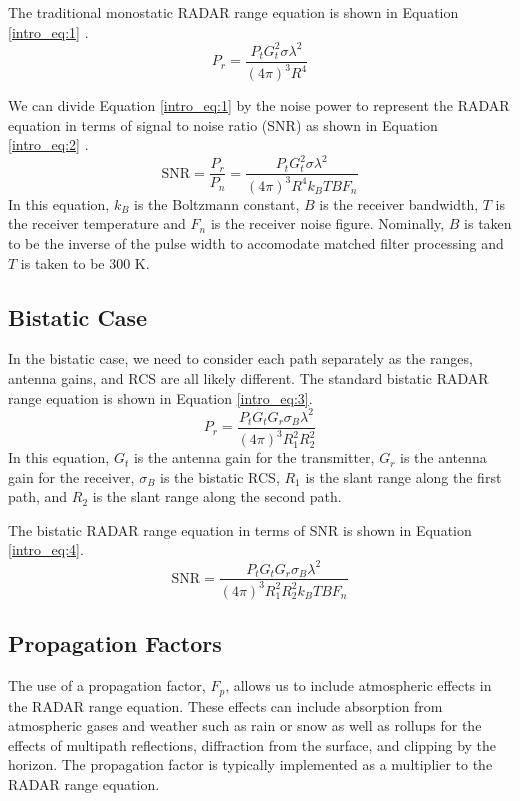 The traditional monostatic RADAR range equation is shown in Equation \ref{intro_eq:1} \cite{skolnik_handbook}.
  \begin{equation}
  \label{intro_eq:1}
 P_r = \frac{P_tG_t^2\sigma\lambda^2}{\left(4\pi\right)^3R^4}
  \end{equation}

We can divide Equation \ref{intro_eq:1} by the noise power to represent the RADAR equation in terms of signal to noise ratio (SNR) as shown in Equation \ref{intro_eq:2} \cite{skolnik_handbook}.
\begin{equation}
    \label{intro_eq:2}
\text{SNR} = \frac{P_r}{P_n} = \frac{P_tG_t^2\sigma\lambda^2}{\left(4\pi\right)^3 R^4k_BTBF_n}
\end{equation}
In this equation, $k_B$ is the Boltzmann constant, $B$ is the receiver bandwidth, $T$ is the receiver temperature and $F_n$ is the receiver noise figure. Nominally, $B$ is taken to be the inverse of the pulse width to accomodate matched filter processing and $T$ is taken to be $300$ K.

\subsection{Bistatic Case}
In the bistatic case, we need to consider each path separately as the ranges, antenna gains, and RCS are all likely different. The standard bistatic RADAR range equation is shown in Equation \ref{intro_eq:3}.
  \begin{equation}
  \label{intro_eq:3}
 P_r = \frac{P_tG_tG_r\sigma_B\lambda^2}{\left(4\pi\right)^3R_1^2R_2^2}
  \end{equation}
In this equation, $G_t$ is the antenna gain for the transmitter, $G_r$ is the antenna gain for the receiver, $\sigma_B$ is the bistatic RCS, $R_1$ is the slant range along the first path, and $R_2$ is the slant range along the second path.

The bistatic RADAR range equation in terms of SNR is shown in Equation \ref{intro_eq:4}.
\begin{equation}
    \label{intro_eq:4}
\text{SNR} = \frac{P_tG_tG_r\sigma_B\lambda^2}{\left(4\pi\right)^3 R_1^2R_2^2k_BTBF_n}
\end{equation}

\subsection{Propagation Factors}
The use of a propagation factor, $F_p$, allows us to include atmospheric effects in the RADAR range equation. These effects can include absorption from atmospheric gases and weather such as rain or snow as well as rollups for the effects of multipath reflections, diffraction from the surface, and clipping by the horizon. The propagation factor is typically implemented as a multiplier to the RADAR range equation.

